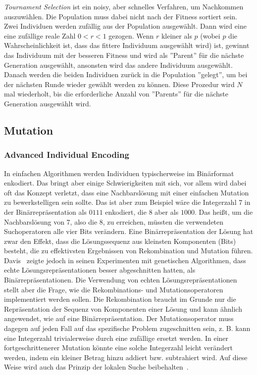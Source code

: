 \documentclass{article}
\begin{document}
\textit{Tournament Selection} ist ein noisy, aber schnelles Verfahren, um Nachkommen auszuwählen. Die Population muss dabei nicht nach der Fitness sortiert sein. Zwei Individuen werden zufällig aus der Population ausgewählt. Dann wird eine eine zufällige reale Zahl $0 < r < 1$ gezogen. Wenn $r$ kleiner als $p$ (wobei $p$ die Wahrscheinlichkeit ist, dass das fittere Individuum ausgewählt wird) ist, gewinnt das Individuum mit der besseren Fitness und wird als ''Parent'' für die nächste Generation ausgewählt, ansonsten wird das andere Individuum ausgewählt. Danach werden die beiden Individuen zurück in die Population ''gelegt'', um bei der nächsten Runde wieder gewählt werden zu können. Diese Prozedur wird $N$ mal wiederholt, bis die erforderliche Anzahl von ''Parents'' für die nächste Generation ausgewählt wird.


\subsection{Mutation}

\subsubsection{Advanced Individual Encoding}
In einfachen Algorithmen werden Individuen typischerweise im Binärformat enkodiert. Das bringt aber einige Schwierigkeiten mit sich, vor allem wird dabei oft das Konzept verletzt, dass eine Nachbarslösung mit einer einfachen Mutation zu bewerkstelligen sein sollte. Das ist aber zum Beispiel wäre die Integerzahl 7 in der Binärrepräsentation als $0111$ enkodiert, die 8 aber als $1000$. Das heißt, um die Nachbarslösung von 7, also die 8, zu erreichen, müssten die verwendeten Suchoperatoren alle vier Bits verändern. Eine Binärrepräsentation der Lösung hat zwar den Effekt, dass die Lösungssequenz aus kleinsten Komponenten (Bits) besteht, die zu effektivsten Ergebnissen von Rekombination und Mutation führen. Davis~\cite{Davis1991} zeigte jedoch in seinen Experimenten mit genetischen Algorithmen, dass echte Lösungsrepräsentationen besser abgeschnitten hatten, als Binärrepräsentationen. Die Verwendung von echten Lösungsrepräsentationen stellt aber die Frage, wie die Rekombinations- und Mutationsoperatoren implementiert werden sollen. Die Rekombination braucht im Grunde nur die Repräsentation der Sequenz von Komponenten einer Lösung und kann ähnlich angewendet, wie auf eine Binärrepräsentation. Der Mutationsoperator muss dagegen auf jeden Fall auf das spezifische Problem zugeschnitten sein, z. B. kann eine Integerzahl trivialerweise durch eine zufällige ersetzt werden. In einer fortgeschrittenerer Mutation könnte eine solche Integerzahl leicht verändert werden, indem ein kleiner Betrag hinzu addiert bzw. subtrahiert wird. Auf diese Weise wird auch das Prinzip der lokalen Suche beibehalten~\cite{Davis1991}.
\end{document}
